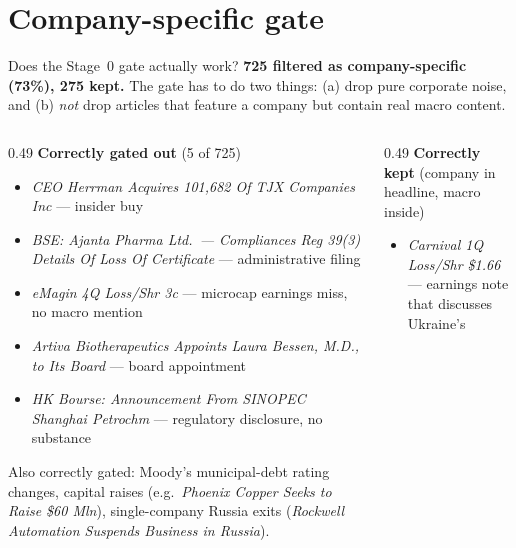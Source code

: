 \documentclass[10pt,aspectratio=169]{beamer}
\begin{document}
\section{Company-specific gate}

\begin{frame}{Does the Stage~0 gate actually work?}
  \scriptsize
  \textbf{725 filtered as company-specific (73\%), 275 kept.} The gate has to do two things:
  (a) drop pure corporate noise, and (b) \emph{not} drop articles that feature a company but
  contain real macro content.

  \vspace{0.5em}
  \begin{columns}[T,onlytextwidth]
    \begin{column}{0.49\textwidth}
      \textbf{\textcolor{goodgreen}{Correctly gated out}} (5 of 725)
      \vspace{0.1em}
      \begin{itemize}\itemsep0.1em
        \item \emph{CEO Herrman Acquires 101{,}682 Of TJX Companies Inc} --- insider buy
        \item \emph{BSE: Ajanta Pharma Ltd.\ --- Compliances Reg 39(3) Details Of Loss Of
              Certificate} --- administrative filing
        \item \emph{eMagin 4Q Loss/Shr 3c} --- microcap earnings miss, no macro mention
        \item \emph{Artiva Biotherapeutics Appoints Laura Bessen, M.D., to Its Board} ---
              board appointment
        \item \emph{HK Bourse: Announcement From SINOPEC Shanghai Petrochm} --- regulatory
              disclosure, no substance
      \end{itemize}
      \vspace{0.2em}
      Also correctly gated: Moody's municipal-debt rating changes, capital raises (e.g.\
      \emph{Phoenix Copper Seeks to Raise \$60 Mln}), single-company Russia exits (\emph{Rockwell
      Automation Suspends Business in Russia}).
    \end{column}
    \begin{column}{0.49\textwidth}
      \textbf{\textcolor{goodgreen}{Correctly kept}} (company in headline, macro inside)
      \vspace{0.1em}
      \begin{itemize}\itemsep0.1em
        \item \emph{Carnival 1Q Loss/Shr \$1.66} --- earnings note that discusses Ukraine's

\end{itemize}
\end{column}
\end{columns}
\end{frame}
\end{document}
